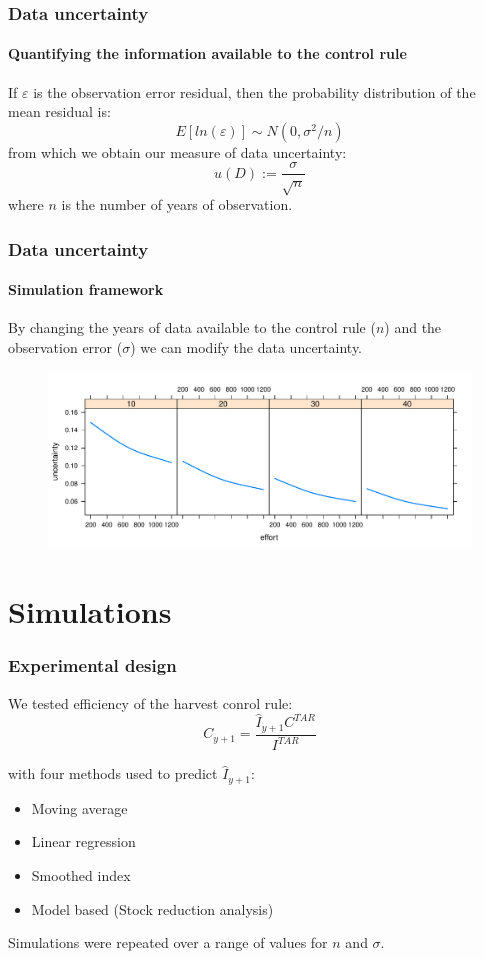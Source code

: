 \documentclass[pdf]{beamer}
\begin{document}
\begin{frame}
\frametitle{Data uncertainty}
\framesubtitle{Quantifying the information available to the control rule}
If $\varepsilon$ is the observation error residual, then the probability distribution of the mean residual is:
\begin{equation}
E[ln(\varepsilon)] \sim N\left(0,\sigma^2/n\right) \nonumber
\end{equation}
from which we obtain our measure of data uncertainty:
\begin{equation}
u(D) := \frac{\sigma}{\sqrt{n}} \nonumber
\end{equation}
where $n$ is the number of years of observation.
\end{frame}

\begin{frame}
\frametitle{Data uncertainty}
\framesubtitle{Simulation framework}

By changing the years of data available to the control rule ($n$) and the observation error ($\sigma$) we can modify the data uncertainty.

\begin{figure}
\includegraphics[width=1\textwidth]{../res/uncertainty.pdf}
\end{figure}

\end{frame}

\section{Simulations}
\begin{frame}
\frametitle{Experimental design}

We tested efficiency of the harvest conrol rule:
\begin{equation}
C_{y+1} = \frac{\hat{I}_{y+1}C^{TAR}}{I^{TAR}}\nonumber
\end{equation}

with four methods used to predict $\hat{I}_{y+1}$:
\begin{itemize}
\item Moving average
\item Linear regression
\item Smoothed index
\item Model based (Stock reduction analysis)
\end{itemize}

Simulations were repeated over a range of values for $n$ and $\sigma$.

\end{frame}
\end{document}
